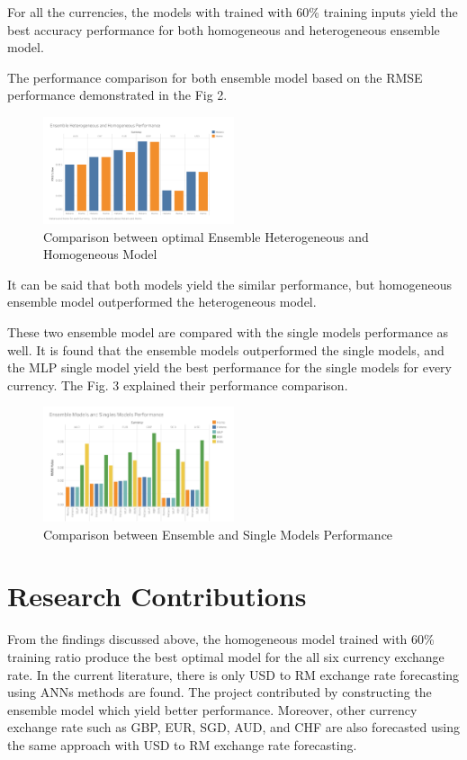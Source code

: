 \documentclass[journal]{IEEEtran}
\begin{document}
For all the currencies, the models with trained with 60\% training inputs yield the best accuracy performance for both homogeneous and heterogeneous ensemble model.


The performance comparison for both ensemble model based on the RMSE performance demonstrated in the Fig 2.  
\begin{figure}[hbt!]\centering
	\includegraphics[width=0.5\textwidth]{compare_homo_hetero}
	\caption{Comparison between optimal Ensemble Heterogeneous and Homogeneous Model}
\end{figure}

It can be said that both models yield the similar performance, but homogeneous ensemble model outperformed the heterogeneous model.

These two ensemble model are compared with the single models performance as well. It is found that the ensemble models outperformed the single models, and the MLP single model yield the best performance for the single models for every currency. The Fig. 3 explained their performance comparison.


\begin{figure}[hbt!]\centering
	\includegraphics[width=0.5\textwidth]{ensemble_single}
	\caption{Comparison between Ensemble and Single Models Performance}
\end{figure}

\section{Research Contributions}

From the findings discussed above, the homogeneous model trained with 60\% training ratio produce the best optimal model for the all six currency exchange rate. In the current literature, there is only USD to RM exchange rate forecasting using ANNs methods are found. The project contributed by constructing the ensemble model which yield better performance. Moreover, other currency exchange rate such as GBP, EUR, SGD, AUD, and CHF are also forecasted using the same approach with USD to RM exchange rate forecasting.
\end{document}
